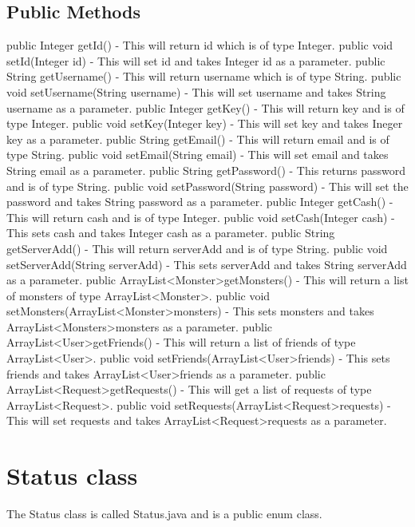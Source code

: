 \documentclass{project}
\begin{document}
\subsection{Public Methods}
public Integer getId() - This will return id which is of type Integer. public void setId(Integer id) - This will set id and takes Integer id as a parameter.
public String getUsername() - This will return username which is of type String. public void setUsername(String username) - This will set username and takes String username as a parameter.
public Integer getKey() - This will return key and is of type Integer. public void setKey(Integer key) - This will set key and takes Ineger key as a parameter.
public String getEmail() - This will return email and is of type String. public void setEmail(String email) - This will set email and takes String email as a parameter.
public String getPassword() - This returns password and is of type String. public void setPassword(String password) - This will set the password and takes String password as a parameter.
public Integer getCash() - This will return cash and is of type Integer. public void setCash(Integer cash) - This sets cash and takes Integer cash as a parameter.
public String getServerAdd() - This will return serverAdd and is of type String. public void setServerAdd(String serverAdd) - This sets serverAdd and takes String serverAdd as a parameter.
public ArrayList\textless Monster\textgreater  getMonsters() - This will return a list of monsters of type ArrayList\textless Monster\textgreater. public void setMonsters(ArrayList\textless Monster\textgreater  monsters) - This sets monsters and takes ArrayList\textless Monsters\textgreater  monsters as a parameter.
public ArrayList\textless User\textgreater  getFriends() - This will return a list of friends of type ArrayList\textless User\textgreater. public void setFriends(ArrayList\textless User\textgreater  friends) - This sets friends and takes ArrayList\textless User\textgreater  friends as a parameter.
public ArrayList\textless Request\textgreater  getRequests() - This will get a list of requests of type ArrayList\textless Request\textgreater. public void setRequests(ArrayList\textless Request\textgreater  requests) - This will set requests and takes ArrayList\textless Request\textgreater  requests as a parameter.


\section{Status class}
The Status class is called Status.java and is a public enum class.
\end{document}

